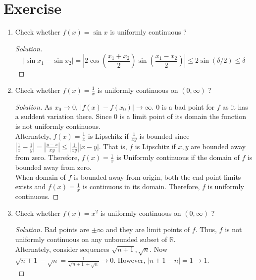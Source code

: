 \section{Exercise}
\begin{enumerate}
	\item Check whether $f(x) = \sin x$ is uniformly continuous ?
	\begin{proof}[Solution]
		$$ |\sin x_1 - \sin x_2| = \left|2\cos\left(\frac{x_1+x_2}{2}\right)\sin\left(\frac{x_1-x_2}{2}\right)\right| \le 2\sin(\delta/2) \le \delta $$
	\end{proof}
	\item Check whether $f(x) = \frac{1}{x}$ is uniformly continuous on $(0,\infty)$ ?
	\begin{proof}[Solution]
		As $x_0 \to 0$, $|f(x)-f(x_0)| \to \infty$.
		$0$ is a bad point for $f$ as it has a suddent variation there. Since $0$ is a limit point of its domain the function is not uniformly continuous.\\

		Alternately, $f(x) = \frac{1}{x}$ is Lipschitz if $\frac{1}{xy}$ is bounded since $|\frac{1}{x}-\frac{1}{y}| = | \frac{y-x}{xy} | \le |\frac{1}{xy}| |x-y|$. That is, $f$ is Lipschitz if $x,y$ are bounded away from zero. Therefore, $f(x) = \frac{1}{x}$ is Uniformly continuous if the domain of $f$ is bounded away from zero.\\

		When domain of $f$ is bounded away from origin, both the end point limits exists and $f(x)=\frac{1}{x}$ is continuous in its domain. Therefore, $f$ is uniformly continuous.
	\end{proof}
	\item Check whether $f(x) = x^2$ is uniformly continuous on $(0,\infty)$ ?
	\begin{proof}[Solution]
		Bad points are $\pm \infty$ and they are limit points of $f$. Thus, $f$ is not uniformly continuous on any unbounded subset of $\mathbb{R}$.\\

		Alternately, consider sequences $\sqrt{n+1}, \sqrt{n}$. Now $\sqrt{n+1} - \sqrt{n} = \frac{1}{\sqrt{n+1}+\sqrt{n}} \to 0$. However, $|n+1-n| = 1 \to 1$.\\


\end{proof}
\end{enumerate}
